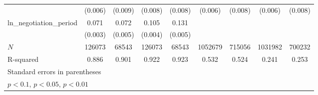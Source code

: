 {\begin{adjustbox}{max width=\textwidth}
\begin{tabular}{l*{8}{c}}
            &     (0.006)         &     (0.009)         &     (0.008)         &     (0.008)         &     (0.006)         &     (0.008)         &     (0.006)         &     (0.008)         \\
\addlinespace
ln\_negotiation\_period&       0.071\sym{***}&       0.072\sym{***}&       0.105\sym{***}&       0.131\sym{***}&                     &                     &                     &                     \\
            &     (0.003)         &     (0.005)         &     (0.004)         &     (0.005)         &                     &                     &                     &                     \\
\midrule
\(N\)       &      126073         &       68543         &      126073         &       68543         &     1052679         &      715056         &     1031982         &      700232         \\
R-squared   &       0.886         &       0.901         &       0.922         &       0.923         &       0.532         &       0.524         &       0.241         &       0.253         \\
\bottomrule
\multicolumn{9}{l}{\footnotesize Standard errors in parentheses}\\
\multicolumn{9}{l}{\footnotesize \sym{*} \(p<0.1\), \sym{**} \(p<0.05\), \sym{***} \(p<0.01\)}\\
\end{tabular}
\end{adjustbox}
}
